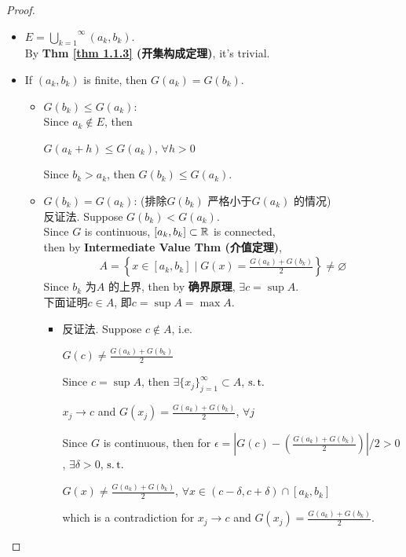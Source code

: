 \begin{lemma}
\begin{proof}
\begin{itemize}
				\vspace{2em}
				
				\item $E = \overset{\infty}{\underset{k = 1}{\bigcup}}{(a_k , b_k)}$. \\
				By \textbf{Thm \ref{thm 1.1.3} (开集构成定理)}, it's trivial.
				
				\vspace{2em}
				
				\item If $(a_k , b_k)$ is finite, then $G(a_k) = G(b_k)$. 
				\begin{itemize}
					\item $G(b_k) \leq G(a_k)$: \\
					Since $a_k \notin E$, then
					\begin{center}
						$G(a_k + h) \leq G(a_k)$, $\forall h > 0$
					\end{center}
					Since $b_k > a_k$, then $G(b_k) \leq G(a_k)$.
					
					\vspace{1em}
					
					\item $G(b_k) = G(a_k)$: (排除$G(b_k)$ 严格小于$G(a_k)$ 的情况)\\
					反证法. Suppose $G(b_k) < G(a_k)$. \\
					Since $G$ is continuous, $[a_k , b_k] \subset \mathbb{R}$ is connected, \\
					then by \textbf{Intermediate Value Thm (介值定理)},
					\begin{align}
						A = \left\{ x \in [a_k , b_k] \mid G(x) = \frac{G(a_k) + G(b_k)}{2} \right\} \neq \varnothing
					\end{align}
					Since $b_k$ 为$A$ 的上界, then by \textbf{确界原理}, $\exists c = \sup{A}$. \\
					下面证明$c \in A$, 即$c = \sup{A} = \max{A}$. 
					
					\vspace{1em}
					
					\begin{itemize}
						\item 反证法. Suppose $c \notin A$, i.e.
						\begin{center}
							$G(c) \neq \frac{G(a_k) + G(b_k)}{2}$
						\end{center}
						Since $c = \sup{A}$, then $\exists \{ x_j \}_{j = 1}^{\infty} \subset A$, $\operatorname{s.t.}$
						\begin{center}
							$x_j \to c$ and $G(x_j) = \frac{G(a_k) + G(b_k)}{2}$, $\forall j$
						\end{center}
						Since $G$ is continuous, then for $\epsilon = \left| G(c) - \left( \frac{G(a_k) + G(b_k)}{2} \right) \right| / 2 > 0$, $\exists \delta > 0$, $\operatorname{s.t.}$
						\begin{center}
							$G(x) \neq \frac{G(a_k) + G(b_k)}{2}$, $\forall x \in (c - \delta , c + \delta) \cap [a_k , b_k]$
						\end{center}
						which is a contradiction for $x_j \to c$ and $G(x_j) = \frac{G(a_k) + G(b_k)}{2}$.
					\end{itemize}
					

\end{itemize}
\end{itemize}
\end{proof}
\end{lemma}
